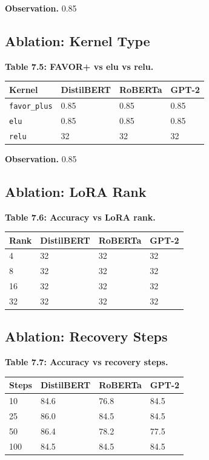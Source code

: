 \textbf{Observation.} 0.85

\subsection{Ablation: Kernel Type}

\textbf{Table 7.5: FAVOR+ vs elu vs relu.}

\begin{table}[H]
\centering
\small
\begin{tabular}{llll}
\toprule
\textbf{Kernel} & \textbf{DistilBERT} & \textbf{RoBERTa} & \textbf{GPT-2} \\
\midrule
\texttt{favor\_plus} & 0.85 & 0.85 & 0.85 \\
\texttt{elu} & 0.85 & 0.85 & 0.85 \\
\texttt{relu} & 32 & 32 & 32 \\
\bottomrule
\end{tabular}
\end{table}

\textbf{Observation.} 0.85

\subsection{Ablation: LoRA Rank}

\textbf{Table 7.6: Accuracy vs LoRA rank.}

\begin{table}[H]
\centering
\small
\begin{tabular}{llll}
\toprule
\textbf{Rank} & \textbf{DistilBERT} & \textbf{RoBERTa} & \textbf{GPT-2} \\
\midrule
4 & 32 & 32 & 32 \\
8 & 32 & 32 & 32 \\
16 & 32 & 32 & 32 \\
32 & 32 & 32 & 32 \\
\bottomrule
\end{tabular}
\end{table}

\subsection{Ablation: Recovery Steps}

\textbf{Table 7.7: Accuracy vs recovery steps.}

\begin{table}[H]
\centering
\small
\begin{tabular}{llll}
\toprule
\textbf{Steps} & \textbf{DistilBERT} & \textbf{RoBERTa} & \textbf{GPT-2} \\
\midrule
10 & 84.6 & 76.8 & 84.5 \\
25 & 86.0 & 84.5 & 84.5 \\
50 & 86.4 & 78.2 & 77.5 \\
100 & 84.5 & 84.5 & 84.5 \\
\bottomrule
\end{tabular}
\end{table}

